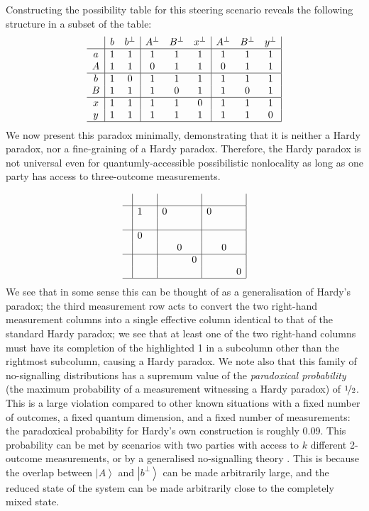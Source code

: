 \documentclass[reprint]{revtex4-1}
\theoremstyle{definition}
\newcommand{\ket}[1]{{\left\vert{#1}\right\rangle}}
\begin{document}
Constructing the possibility table for this steering scenario reveals the following structure in a subset of the table:
\begin{equation*}
\begin{array}{ c  | c c | c c c| c c c|}\
  & b&b^\perp& A^\perp &B^\perp&x^\perp& A^\perp &B^\perp&y^\perp \\ \hline
  a &1&1&1&1&1&1&1&1\\ 
  A &1&1&0&1&1&0&1&1\\ \hline
  b &1&0&1&1&1&1&1&1\\ 
 B  &1&1&1&0&1&1&0&1\\ \hline
 x &1&1&1&1&0&1&1&1\\ 
 y &1&1&1&1&1&1&1&0\\ \hline
\end{array}
\end{equation*}
We now present this paradox minimally, demonstrating that it is neither a Hardy paradox, nor a fine-graining of a Hardy paradox. Therefore, the Hardy paradox is not universal even for quantumly-accessible possibilistic nonlocality as long as one party has access to three-outcome measurements. 

\begin{equation*}
\begin{array}{ c | c c | c c c| c c c|}
&&&&&&&& \\ \hline
&1&&0&&&0&&\\
   &&&&&&&&\\ \hline
   &0&&&&&&&\\ 
  &&&&0&&&0&\\ \hline
  &&&&&0&&&\\ 
  &&&&&&&&0\\ \hline
\end{array}
\end{equation*}
We see that in some sense this can be thought of as a generalisation of Hardy's paradox; the third measurement row acts to convert the two right-hand measurement columns into a single effective column identical to that of the standard Hardy paradox; we see that at least one of the two right-hand columns must have its completion of the highlighted 1 in a subcolumn other than the rightmost subcolumn, causing a Hardy paradox. We note also that this family of no-signalling distributions has a supremum value of the \emph{paradoxical probability} (the maximum probability of a measurement witnessing a Hardy paradox) of $\nicefrac{1}{2}$. This is a large violation compared to other known situations with a fixed number of outcomes, a fixed quantum dimension, and a fixed number of measurements: the paradoxical probability for Hardy's own construction is roughly 0.09. This probability can be met by scenarios with two parties with access to $k$ different 2-outcome measurements, or by a generalised no-signalling theory \cite{Mans2016}. This is because the overlap between $\ket{A}$ and $\ket{b^\perp}$ can be made arbitrarily large, and the reduced state of the system can be made arbitrarily close to the completely mixed state.
\end{document}
